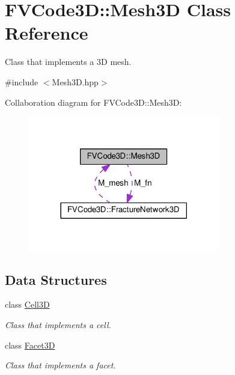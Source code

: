 \hypertarget{classFVCode3D_1_1Mesh3D}{}\section{F\+V\+Code3D\+:\+:Mesh3D Class Reference}
\label{classFVCode3D_1_1Mesh3D}


Class that implements a 3D mesh.  




{\ttfamily \#include $<$Mesh3\+D.\+hpp$>$}



Collaboration diagram for F\+V\+Code3D\+:\+:Mesh3D\+:
\nopagebreak
\begin{figure}[H]
\begin{center}
\leavevmode
\includegraphics[width=237pt]{classFVCode3D_1_1Mesh3D__coll__graph}
\end{center}
\end{figure}
\subsection*{Data Structures}
\begin{DoxyCompactItemize}
\item 
class \hyperlink{classFVCode3D_1_1Mesh3D_1_1Cell3D}{Cell3D}
\begin{DoxyCompactList}\small\item\em Class that implements a cell. \end{DoxyCompactList}\item 
class \hyperlink{classFVCode3D_1_1Mesh3D_1_1Facet3D}{Facet3D}
\begin{DoxyCompactList}\small\item\em Class that implements a facet. \end{DoxyCompactList}\end{DoxyCompactItemize}
